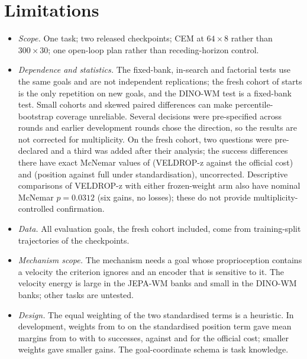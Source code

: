 \section{Limitations}
\begin{itemize}[leftmargin=*,itemsep=1pt]
\item \emph{Scope.} One task; two released checkpoints; CEM at $64\times8$ rather than $300\times30$; one open-loop plan
  rather than receding-horizon control.
\item \emph{Dependence and statistics.} The fixed-bank, in-search and factorial tests use the same \REightN{} goals and
  are not independent replications; the fresh cohort of \RTwN{} starts is the only repetition on new goals, and the
  DINO-WM test is a fixed-bank test. Small cohorts and skewed paired differences can make percentile-bootstrap coverage unreliable. Several decisions were pre-specified across rounds and earlier development rounds
  chose the direction, so the results are not corrected for multiplicity. On the fresh cohort, two questions were
  pre-declared and a third was added after their analysis; the success differences there have exact McNemar values of
  \RTwQTwoMcN{} (VELDROP-z against the official cost) and \RThMcN{} (position against full under standardisation),
  uncorrected. Descriptive comparisons of VELDROP-z with either frozen-weight arm also have nominal McNemar $p=0.0312$ (six gains, no losses); these do not provide multiplicity-controlled confirmation.
\item \emph{Data.} All evaluation goals, the fresh cohort included, come from training-split trajectories of the
  checkpoints.
\item \emph{Mechanism scope.} The mechanism needs a goal whose proprioception contains a velocity the criterion ignores
  and an encoder that is sensitive to it. The velocity energy is large in the JEPA-WM banks and small in the DINO-WM
  banks; other tasks are untested.
\item \emph{Design.} The equal weighting of the two standardised terms is a heuristic. In development, weights from
  \DevSensLamMin{} to \DevSensLamMax{} on the standardised position term gave mean margins from \DevSensMinMean{} to
  \DevSensMaxMean{} with \DevSensSuccMin{} to \DevSensSuccMax{} successes, against \DevOff{} and \DevOffSucc{} for the
  official cost; smaller weights gave smaller gains. The goal-coordinate schema is task knowledge.
\end{itemize}

